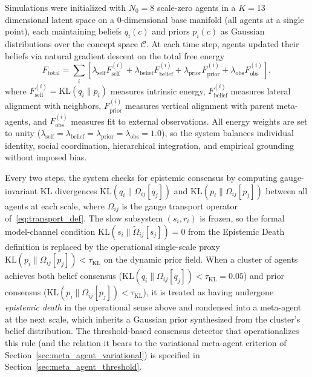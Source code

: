 \documentclass[11pt]{article}
\begin{document}
Simulations were initialized with $N_0 = 8$ scale-zero agents in a $K=13$ dimensional latent space on a 0-dimensional base manifold (all agents at a single point), each maintaining beliefs $q_i(c)$ and priors $p_i(c)$ as Gaussian distributions over the concept space $\mathcal{C}$. At each time step, agents updated their beliefs via natural gradient descent on the total free energy
\begin{equation}
F_{\text{total}} = \sum_i \left[ \lambda_{\text{self}} F_{\text{self}}^{(i)} + \lambda_{\text{belief}} F_{\text{belief}}^{(i)} + \lambda_{\text{prior}} F_{\text{prior}}^{(i)} + \lambda_{\text{obs}} F_{\text{obs}}^{(i)} \right],
\end{equation}
where $F_{\text{self}}^{(i)} = \mathrm{KL}(q_i \| p_i)$ measures intrinsic energy, $F_{\text{belief}}^{(i)}$ measures lateral alignment with neighbors, $F_{\text{prior}}^{(i)}$ measures vertical alignment with parent meta-agents, and $F_{\text{obs}}^{(i)}$ measures fit to external observations. All energy weights are set to unity ($\lambda_{\text{self}} = \lambda_{\text{belief}} = \lambda_{\text{prior}} = \lambda_{\text{obs}} = 1.0$), so the system balances individual identity, social coordination, hierarchical integration, and empirical grounding without imposed bias.

Every two steps, the system checks for epistemic consensus by computing gauge-invariant KL divergences $\mathrm{KL}(q_i \| \Omega_{ij}[q_j])$ and $\mathrm{KL}(p_i \| \Omega_{ij}[p_j])$ between all agents at each scale, where $\Omega_{ij}$ is the gauge transport operator of~\eqref{eq:transport_def}. The slow subsystem $(s_i, r_i)$ is frozen, so the formal model-channel condition $\mathrm{KL}(s_i \| \tilde{\Omega}_{ij}[s_j]) = 0$ from the Epistemic Death definition is replaced by the operational single-scale proxy $\mathrm{KL}(p_i \| \Omega_{ij}[p_j]) < \tau_{\mathrm{KL}}$ on the dynamic prior field. When a cluster of agents achieves both belief consensus ($\mathrm{KL}(q_i \| \Omega_{ij}[q_j]) < \tau_{\mathrm{KL}} = 0.05$) and prior consensus ($\mathrm{KL}(p_i \| \Omega_{ij}[p_j]) < \tau_{\mathrm{KL}}$), it is treated as having undergone \emph{epistemic death} in the operational sense above and condensed into a meta-agent at the next scale, which inherits a Gaussian prior synthesized from the cluster's belief distribution. The threshold-based consensus detector that operationalizes this rule (and the relation it bears to the variational meta-agent criterion of Section~\ref{sec:meta_agent_variational}) is specified in Section~\ref{sec:meta_agent_threshold}.
\end{document}
